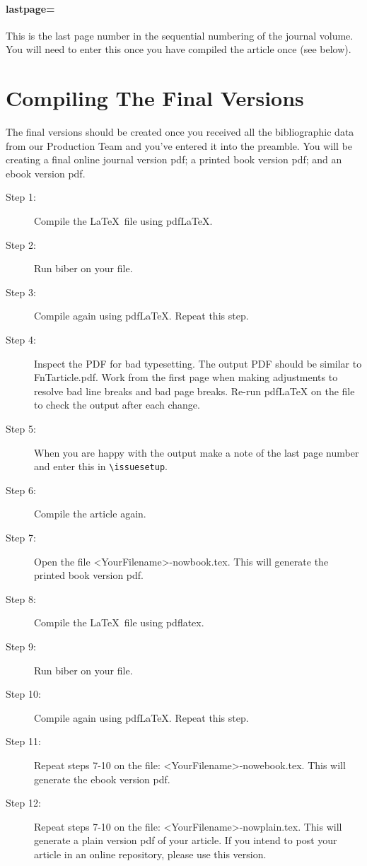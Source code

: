 \documentclass[examplefnt,biber]{nowfnt} %
\begin{document}
\paragraph{lastpage=}
This is the last page number in the sequential numbering of the journal volume. You will need to enter this
once you have compiled the article once (see below).


\section{Compiling The Final Versions}\label{s:Final}

The final versions should be created once you received all the bibliographic data from our Production Team
and you've entered it into the preamble. You will be creating a final online journal version pdf; a printed book version pdf;
and an ebook version pdf.
\begin{description}
\item [Step 1:] Compile the \LaTeX\ file using pdfLaTeX.
\item [Step 2:] Run biber on your file.
\item [Step 3:] Compile again using pdfLaTeX. Repeat this step.
\item [Step 4:] Inspect the PDF for bad typesetting. The output PDF should be similar to FnTarticle.pdf. Work from the first page when making adjustments to resolve bad line breaks and bad page breaks. Re-run pdfLaTeX on the file to check the output after each change.
\item [Step 5:] When you are happy with the output make a note of the last page number and enter this in  \verb+\issuesetup+.
\item [Step 6:] Compile the article again.
\item [Step 7:] Open the file <YourFilename>-nowbook.tex. This will generate the printed book version pdf.
\item [Step 8:] Compile the \LaTeX\ file using pdflatex.
\item [Step 9:] Run biber on your file.
\item [Step 10:] Compile again using pdfLaTeX. Repeat this step.
\item [Step 11:] Repeat steps 7-10 on the file: <YourFilename>-nowebook.tex. This will generate the ebook version pdf.
\item [Step 12:] Repeat steps 7-10 on the file: <YourFilename>-nowplain.tex. This will generate a plain version pdf of your article. If you intend to post your article in an online repository, please use this version.
\end{description}
\end{document}
